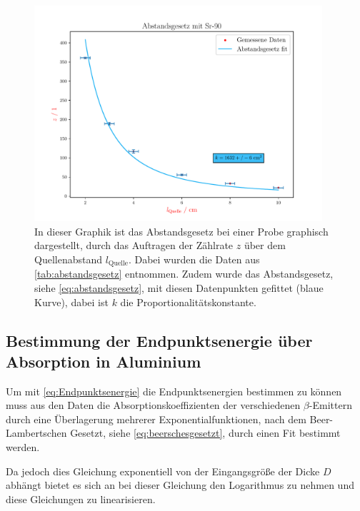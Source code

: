 \documentclass[12pt,english,ngerman]{scrartcl}
\begin{document}
\begin{figure}[H]
  \begin{center}
    \includegraphics[width = 0.95\textwidth]{figures/abstandsgesetz.pdf}
  \end{center}
  \caption[Abstandsgesetz einer  Probe]{In dieser Graphik ist
    das Abstandsgesetz bei einer  Probe graphisch dargestellt,
    durch das Auftragen der Zählrate $z$ über dem Quellenabstand
    $l_{\mathrm{Quelle}}$. Dabei wurden die Daten aus
  \autoref{tab:abstandsgesetz} entnommen. Zudem wurde das Abstandsgesetz, siehe
\autoref{eq:abstandsgesetz}, mit diesen Datenpunkten gefittet (blaue Kurve),
dabei ist $k$ die Proportionalitätskonstante.}
  \label{fig:abstandsgesetz}
\end{figure}


\subsection{Bestimmung der Endpunktsenergie über Absorption in Aluminium}

Um mit \autoref{eq:Endpunktsenergie} die Endpunktsenergien bestimmen zu können
muss aus den Daten die Absorptionskoeffizienten der verschiedenen
$\beta$-Emittern durch eine Überlagerung mehrerer Exponentialfunktionen, nach
dem Beer-Lambertschen Gesetzt, siehe \autoref{eq:beerschesgesetzt}, durch einen
Fit bestimmt werden. 


Da jedoch dies Gleichung exponentiell von der Eingangsgröße der Dicke $D$ abhängt bietet
es sich an bei dieser Gleichung den Logarithmus zu nehmen und diese Gleichungen
zu linearisieren.
\end{document}

